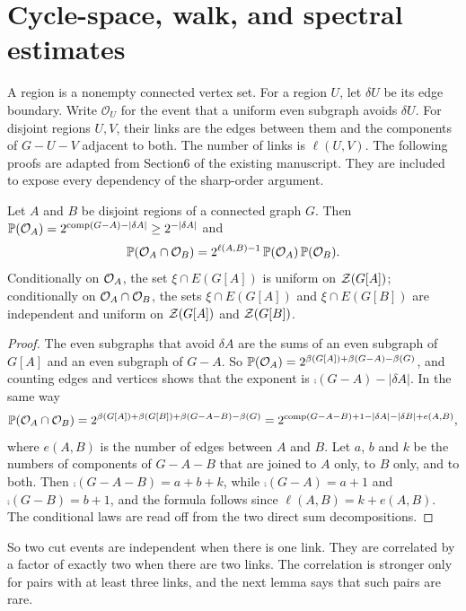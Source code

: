 \section{Cycle-space, walk, and spectral estimates}
\label{sec:polynomial-foundations}

A region is a nonempty connected vertex set.
For a region $U$, let $\delta U$ be its edge boundary.
Write $\mathcal O_U$ for the event that a uniform even subgraph avoids $\delta U$.
For disjoint regions $U,V$, their links are the edges between them and the components of $G-U-V$ adjacent to both.
The number of links is $\ell(U,V)$.
The following proofs are adapted from Section6 of the existing manuscript.
They are included to expose every dependency of the sharp-order argument.

\begin{lemma}\label{lem:link}
Let $A$ and $B$ be disjoint regions of a connected graph $G$. Then
$\mathbb P(\mathcal O_A)=2^{\operatorname{comp}(G-A)-|\delta A|}\ge2^{-|\delta A|}$ and
\[
  \mathbb P(\mathcal O_A\cap\mathcal O_B)=2^{\ell(A,B)-1}\,\mathbb P(\mathcal O_A)\,\mathbb P(\mathcal O_B).
\]
Conditionally on $\mathcal O_A$, the set $\xi\cap E(G[A])$ is uniform on $\mathcal Z(G[A])$; conditionally on
$\mathcal O_A\cap\mathcal O_B$, the sets $\xi\cap E(G[A])$ and $\xi\cap E(G[B])$ are independent and uniform on
$\mathcal Z(G[A])$ and $\mathcal Z(G[B])$.
\end{lemma}

\begin{proof}
The even subgraphs that avoid $\delta A$ are the sums of an even subgraph of $G[A]$ and an even
subgraph of $G-A$. So $\mathbb P(\mathcal O_A)=2^{\beta(G[A])+\beta(G-A)-\beta(G)}$, and counting edges and
vertices shows that the exponent is $\comp(G-A)-|\delta A|$. In the same way
\[
  \mathbb P(\mathcal O_A\cap\mathcal O_B)=2^{\beta(G[A])+\beta(G[B])+\beta(G-A-B)-\beta(G)}
     =2^{\operatorname{comp}(G-A-B)+1-|\delta A|-|\delta B|+e(A,B)},
\]
where $e(A,B)$ is the number of edges between $A$ and $B$. Let $a$, $b$ and $k$ be the numbers of
components of $G-A-B$ that are joined to $A$ only, to $B$ only, and to both. Then
$\comp(G-A-B)=a+b+k$, while $\comp(G-A)=a+1$ and $\comp(G-B)=b+1$, and the formula follows since
$\ell(A,B)=k+e(A,B)$. The conditional laws are read off from the two direct sum decompositions.
\end{proof}

So two cut events are independent when there is one link. They are correlated by a factor of
exactly two when there are two links. The correlation is stronger only for pairs with at least
three links, and the next lemma says that such pairs are rare.

